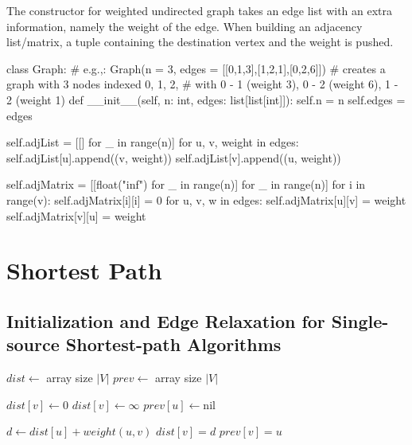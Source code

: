 
\noindent The constructor for weighted undirected graph takes an edge list with an extra information, namely the weight of the edge.
When building an adjacency list/matrix, a tuple containing the destination vertex and the weight is pushed.

\begin{python}
class Graph:
    # e.g.,: Graph(n = 3, edges = [[0,1,3],[1,2,1],[0,2,6]])
    # creates a graph with 3 nodes indexed 0, 1, 2,
    # with 0 - 1 (weight 3), 0 - 2 (weight 6), 1 - 2 (weight 1)
    def __init__(self, n: int, edges: list[list[int]]):
        self.n = n
        self.edges = edges

        self.adjList = [[] for _ in range(n)]
        for u, v, weight in edges:
            self.adjList[u].append((v, weight))
            self.adjList[v].append((u, weight))

        self.adjMatrix = [[float("inf") for _ in range(n)] for _ in range(n)]
        for i in range(v):
            self.adjMatrix[i][i] = 0
        for u, v, w in edges:
            self.adjMatrix[u][v] = weight
            self.adjMatrix[v][u] = weight
\end{python}

\section{Shortest Path}

\subsection{Initialization and Edge Relaxation for Single-source Shortest-path Algorithms}

\noindent \hrulefill
\begin{algorithmic}[1]
   
    \State $dist \gets$ array size $|V|$
    \State $prev \gets$ array size $|V|$

        $dist[v] \gets 0$
      \EndIf
        $dist[v] \gets \infty$
      \EndIf
      \State $prev[u] \gets \text{nil}$ 
    \EndFor
  \EndFunction
\end{algorithmic}
\noindent \hrulefill

\noindent \hrulefill
\begin{algorithmic}[1]
    \State $d \gets dist[u] + weight(u, v)$
      \State $dist[v] = d$
      \State $prev[v] = u$
    \EndIf
  \EndFunction
\end{algorithmic}
\noindent \hrulefill

